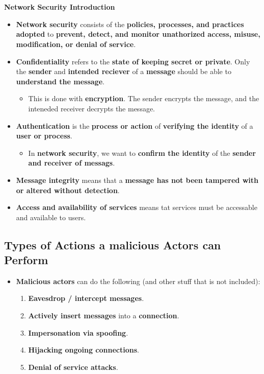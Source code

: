 \documentclass{article}
\begin{document}
    \section*{}

    \textbf{Network Security Introduction}
    \begin{itemize}
        \item \textbf{Network security} consists of the \textbf{policies, processes, and practices adopted} to \textbf{prevent, detect, and monitor unathorized access, misuse, modification, or denial of service}.
        \item \textbf{Confidentiality} refers to the \textbf{state of keeping secret or private}. Only the \textbf{sender} and \textbf{intended reciever} of a \textbf{message} should be able to \textbf{understand the message}.
        \begin{itemize}
            \item This is done with \textbf{encryption}. The sender encrypts the message, and the inteneded receiver decrypts the message.
        \end{itemize}
        \item \textbf{Authentication} is the \textbf{process or action} of \textbf{verifying the identity} of a \textbf{user or process}.
        \begin{itemize}
            \item In \textbf{network security}, we want to \textbf{confirm the identity} of the \textbf{sender and receiver of messags}.
        \end{itemize}
        \item \textbf{Message integrity} means that a \textbf{message has not been tampered with or altered without detection}.
        \item \textbf{Access and availability of services} means tat services must be accessable and available to users.
    \end{itemize}

    \subsection*{Types of Actions a malicious Actors can Perform}
    \begin{itemize}
        \item \textbf{Malicious actors} can do the following (and other stuff that is not included):
        \begin{enumerate}
            \item \textbf{Eavesdrop / intercept messages}.
            \item \textbf{Actively insert messages} into a \textbf{connection}.
            \item \textbf{Impersonation via spoofing}.
            \item \textbf{Hijacking ongoing connections}.
            \item \textbf{Denial of service attacks}. 
        \end{enumerate}
    \end{itemize}
\end{document}
